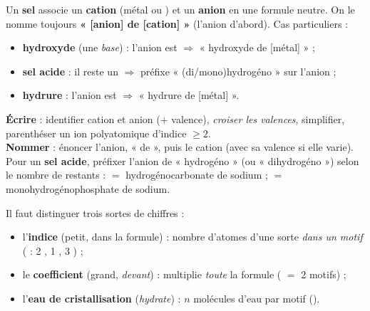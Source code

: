 \documentclass[11pt,a4paper]{article}
\begin{document}

\begin{cle}
Un \textbf{sel} associe un \textbf{cation} (métal ou ) et un \textbf{anion} en une formule neutre.
On le nomme toujours \textbf{« [anion] de [cation] »} (l'anion d'abord). Cas particuliers :
\begin{itemize}[leftmargin=1.5em,topsep=2pt,itemsep=1pt]
  \item \textbf{hydroxyde} (une \emph{base}) : l'anion est  $\Rightarrow$ « hydroxyde de [métal] » ;
  \item \textbf{sel acide} : il reste un  $\Rightarrow$ préfixe « (di/mono)hydrogéno » sur l'anion ;
  \item \textbf{hydrure} : l'anion est  $\Rightarrow$ « hydrure de [métal] ».
\end{itemize}
\end{cle}

\begin{methode}
\textbf{Écrire} : identifier cation et anion (+ valence), \emph{croiser les valences}, simplifier,
parenthéser un ion polyatomique d'indice $\geq 2$. \\
\textbf{Nommer} : énoncer l'anion, « de », puis le cation (avec sa valence si elle varie). Pour un
\textbf{sel acide}, préfixer l'anion de « hydrogéno » (ou « dihydrogéno ») selon le nombre de  restants :
 $=$ hydrogénocarbonate de sodium ;  $=$ monohydrogénophosphate de sodium.
\end{methode}

\begin{cle}
Il faut distinguer trois sortes de chiffres :
\begin{itemize}[leftmargin=1.5em,topsep=2pt,itemsep=1pt]
  \item l'\textbf{indice} (petit, dans la formule) : nombre d'atomes d'une sorte \emph{dans un motif}
        ( : 2 , 1 , 3 ) ;
  \item le \textbf{coefficient} (grand, \emph{devant}) : multiplie \emph{toute} la formule
        ( $=$ 2 motifs) ;
  \item l'\textbf{eau de cristallisation}  (\emph{hydrate}) : $n$ molécules d'eau par motif
        ().
\end{itemize}
\end{cle}
\end{document}
